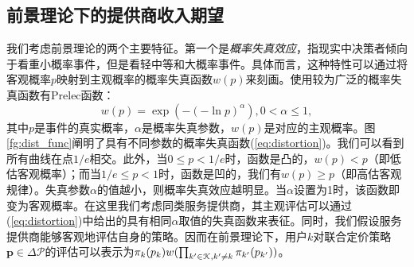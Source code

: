 \subsection{前景理论下的提供商收入期望}

我们考虑前景理论的两个主要特征。第一个是\emph{概率失真效应}，指现实中决策者倾向于看重小概率事件，但是看轻中等和大概率事件。具体而言，这种特性可以通过将客观概率$p$映射到主观概率的概率失真函数$w(p)$来刻画。使用较为广泛的概率失真函数有Prelec函数\cite{Prelec}：
\begin{equation}\label{eq:distortion}
w(p)=\exp(-(-\ln p)^{\alpha}), 0<\alpha\leq 1,
\end{equation}
其中$p$是事件的真实概率，$\alpha$是概率失真参数，$w(p)$是对应的主观概率。图\ref{fg:dist_func}阐明了具有不同参数的概率失真函数(\ref{eq:distortion})。我们可以看到所有曲线在点$1/e$相交。此外，当$0\leq p < 1/e$时，函数是凸的，$w(p)<p$（即低估客观概率）；而当$1/e\leq p<1$时，函数是凹的，我们有$w(p)\geq p$（即高估客观规律）。失真参数$\alpha$的值越小，则概率失真效应越明显。当$\alpha$设置为1时，该函数即变为客观概率。在这里我们考虑同类服务提供商，其主观评估可以通过(\ref{eq:distortion})中给出的具有相同$\alpha$取值的失真函数来表征。同时，我们假设服务提供商能够客观地评估自身的策略。因而在前景理论下，用户$k$对联合定价策略$\mathbf{p}\in\Delta\mathcal{P}$的评估可以表示为$\pi_k(p_k)w(\prod_{k'\in\mathcal{K},k'\neq k}\pi_{k'}(p_{k'}))$。
